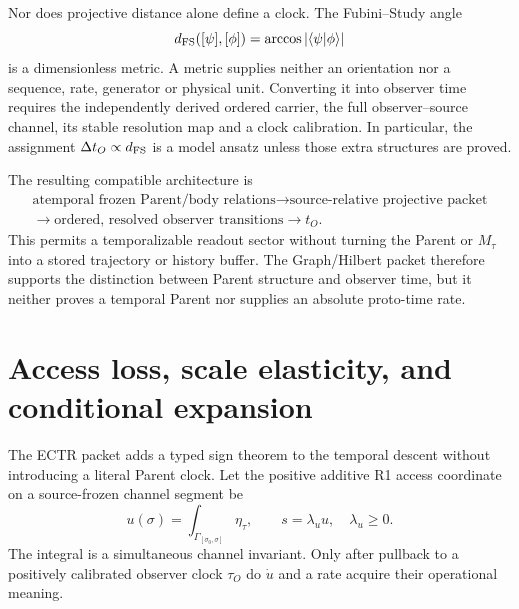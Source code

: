 \documentclass[11pt]{article}
\begin{document}
Nor does projective distance alone define a clock.  The Fubini--Study angle
\begin{equation}
 d_{\rm FS}([\psi],[\phi])=\arccos|\langle\psi|\phi\rangle|
 \label{eq:paperV-fs-distance}
\end{equation}
is a dimensionless metric.  A metric supplies neither an orientation nor a
sequence, rate, generator or physical unit.  Converting it into observer time
requires the independently derived ordered carrier, the full observer--source
channel, its stable resolution map and a clock calibration.  In particular,
the assignment $\Delta t_O\propto d_{\rm FS}$ is a model ansatz unless those
extra structures are proved.

The resulting compatible architecture is
\begin{equation}
 \begin{gathered}
 \text{atemporal frozen Parent/body relations}
 \longrightarrow \text{source-relative projective packet}\\
 \longrightarrow \text{ordered, resolved observer transitions}
 \longrightarrow t_O.
 \end{gathered}
 \label{eq:paperV-gram-temporalization}
\end{equation}
This permits a temporalizable readout sector without turning the Parent or
$M_\tau$ into a stored trajectory or history buffer.  The Graph/Hilbert packet
therefore supports the distinction between Parent structure and observer
time, but it neither proves a temporal Parent nor supplies an absolute
proto-time rate.

\section{Access loss, scale elasticity, and conditional expansion}

The ECTR packet adds a typed sign theorem to the temporal descent without
introducing a literal Parent clock.  Let the positive additive R1 access
coordinate on a source-frozen channel segment be
\begin{equation}
 u(\sigma)=\int_{\Gamma_{[\sigma_0,\sigma]}}\eta_\tau,
 \qquad s=\lambda_u u,\quad \lambda_u\geq0.
 \label{eq:paperv-ectr-access}
\end{equation}
The integral is a simultaneous channel invariant.  Only after pullback to a
positively calibrated observer clock $\tau_O$ do $\dot u$ and a rate acquire
their operational meaning.
\end{document}
